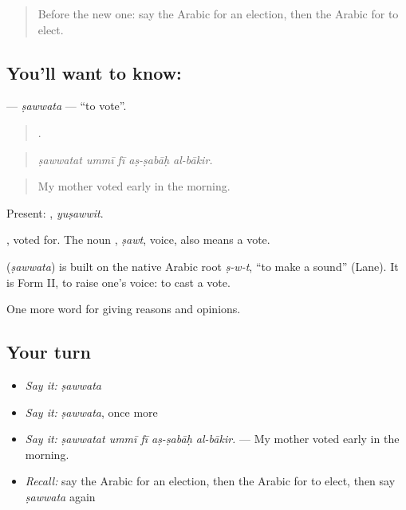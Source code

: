 \label{lesson:AR-C378-sawwata}



\begin{quote}
Before the new one: say the Arabic for an election, then the Arabic for to elect.
\end{quote}

\subsection*{You'll want to know: }
\textbf{} — \emph{ṣawwata} — \textquotedblleft{}to vote\textquotedblright{}.

\begin{quote}
    .
\end{quote}

\begin{quote}
\emph{ṣawwatat ummī fī aṣ-ṣabāḥ al-bākir.}
\end{quote}

\begin{quote}
My mother voted early in the morning.
\end{quote}

Present: , \emph{yuṣawwit}.

 , voted for. The noun , \emph{ṣawt}, voice, also means a vote.

\begin{cousinweb}
\textbf{} (\emph{ṣawwata}) is built on the native Arabic root \emph{ṣ-w-t}, \textquotedblleft{}to make a sound\textquotedblright{} (Lane). It is Form II, to raise one's voice: to cast a vote.
\end{cousinweb}

\begin{grammarlens}[title={What you've built}]
One more word for giving reasons and opinions.
\end{grammarlens}

\subsection*{Your turn}
\begin{itemize}
\raggedright
  \item \emph{Say it:} \emph{ṣawwata}
  \item \emph{Say it:} \emph{ṣawwata}, once more
  \item \emph{Say it:} \emph{ṣawwatat ummī fī aṣ-ṣabāḥ al-bākir.} — My mother voted early in the morning.
  \item \emph{Recall:} say the Arabic for an election, then the Arabic for to elect, then say \emph{ṣawwata} again
\end{itemize}

